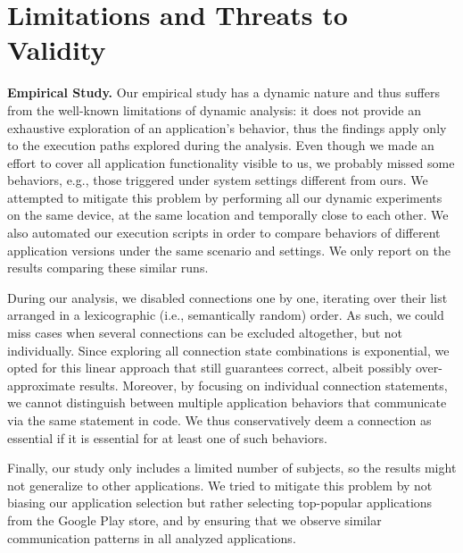 \vspace{0.05in}
\section{Limitations and Threats to \\Validity}
\label{sec:limitations}

\vspace{0.05in}
\noindent 
{\bf Empirical Study.}
Our empirical study has a dynamic nature and thus suffers from the well-known limitations of dynamic analysis: it does not provide an exhaustive exploration of an application's behavior, thus the findings apply only to the execution paths explored during the analysis. 
Even though we made an effort to cover all application functionality visible to us, we probably missed some behaviors, e.g., those triggered under system settings different from ours. 
We attempted to mitigate this problem by performing all our dynamic experiments on the same device, at the same location and temporally close to each other.  
We also automated our execution scripts in order to compare behaviors of different application versions under the same scenario and settings. 
We only report on the results comparing these similar runs.  

During our analysis, we disabled connections one by one, iterating over their list arranged in a lexicographic (i.e., semantically random) order. As such, we could miss cases when 
several connections can be excluded altogether, but not individually. 
Since exploring all connection state combinations is exponential, we opted for this linear approach that still guarantees correct, 
albeit possibly over-approximate results. Moreover, by focusing on individual connection statements, we cannot distinguish between multiple application behaviors
that communicate via the same statement in code. We thus conservatively deem a connection as essential if it is essential for at least one of such behaviors. 
 
Finally, our study only includes a limited number of subjects, so the results might not generalize to other applications.
We tried to mitigate this problem by not biasing our application selection but rather selecting top-popular applications from the Google Play store, and by ensuring that we observe similar communication patterns in all analyzed applications.

